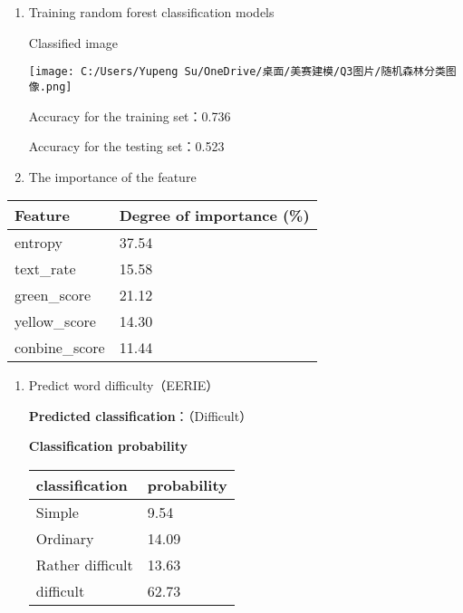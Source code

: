 \documentclass[
]{article}
\begin{document}
\begin{enumerate}
\def\labelenumi{\arabic{enumi}.}
\item
  Training random forest classification models

  Classified image

  \texttt{[image: C:/Users/Yupeng Su/OneDrive/桌面/美赛建模/Q3图片/随机森林分类图像.png]}

  Accuracy for the training set：0.736

  Accuracy for the testing set：0.523
\item
  The importance of the feature
\end{enumerate}

\begin{longtable}[]{@{}ll@{}}
\toprule\noalign{}
Feature & Degree of importance (\%) \\
\midrule\noalign{}
\endhead
\bottomrule\noalign{}
\endlastfoot
entropy & 37.54 \\
text\_rate & 15.58 \\
green\_score & 21.12 \\
yellow\_score & 14.30 \\
conbine\_score & 11.44 \\
\end{longtable}

\begin{enumerate}
\def\labelenumi{\arabic{enumi}.}
\item
  Predict word difficulty（EERIE）

  \textbf{Predicted classification}：（Difficult）

  \textbf{Classification probability}

  \begin{longtable}[]{@{}ll@{}}
  \toprule\noalign{}
  classification & probability \\
  \midrule\noalign{}
  \endhead
  \bottomrule\noalign{}
  \endlastfoot
  Simple & 9.54 \\
  Ordinary & 14.09 \\
  Rather difficult & 13.63 \\
  difficult & 62.73 \\
  \end{longtable}
\end{enumerate}
\end{document}
